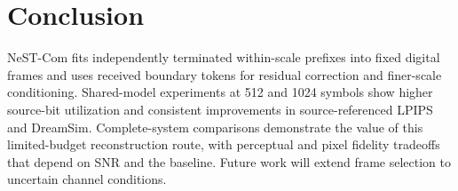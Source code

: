 \section{Conclusion}
NeST-Com fits independently terminated within-scale prefixes into fixed digital frames and uses received boundary tokens for residual correction and finer-scale conditioning. Shared-model experiments at 512 and 1024 symbols show higher source-bit utilization and consistent improvements in source-referenced LPIPS and DreamSim. Complete-system comparisons demonstrate the value of this limited-budget reconstruction route, with perceptual and pixel fidelity tradeoffs that depend on SNR and the baseline. Future work will extend frame selection to uncertain channel conditions.
